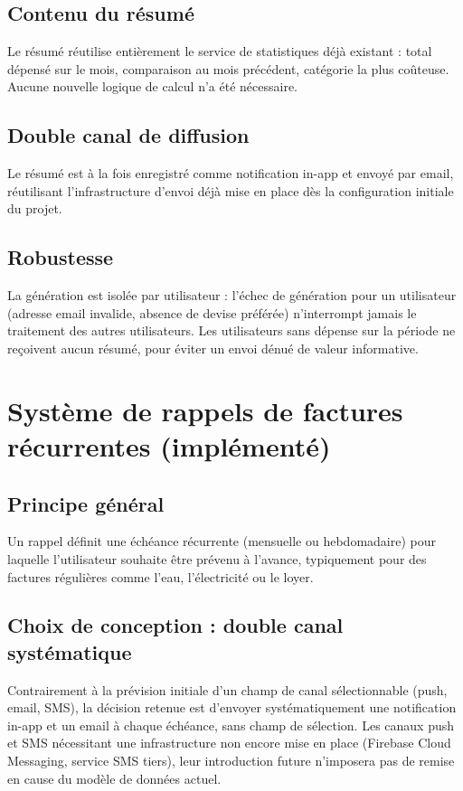 \documentclass[11pt,a4paper]{article}
\begin{document}
\subsection{Contenu du résumé}
Le résumé réutilise entièrement le service de statistiques déjà existant : total dépensé sur le mois, comparaison au mois précédent, catégorie la plus coûteuse. Aucune nouvelle logique de calcul n'a été nécessaire.

\subsection{Double canal de diffusion}
Le résumé est à la fois enregistré comme notification in-app et envoyé par email, réutilisant l'infrastructure d'envoi déjà mise en place dès la configuration initiale du projet.

\subsection{Robustesse}
La génération est isolée par utilisateur : l'échec de génération pour un utilisateur (adresse email invalide, absence de devise préférée) n'interrompt jamais le traitement des autres utilisateurs. Les utilisateurs sans dépense sur la période ne reçoivent aucun résumé, pour éviter un envoi dénué de valeur informative.

\section{Système de rappels de factures récurrentes (implémenté)}

\subsection{Principe général}
Un rappel définit une échéance récurrente (mensuelle ou hebdomadaire) pour laquelle l'utilisateur souhaite être prévenu à l'avance, typiquement pour des factures régulières comme l'eau, l'électricité ou le loyer.

\subsection{Choix de conception : double canal systématique}
Contrairement à la prévision initiale d'un champ de canal sélectionnable (push, email, SMS), la décision retenue est d'envoyer systématiquement une notification in-app et un email à chaque échéance, sans champ de sélection. Les canaux push et SMS nécessitant une infrastructure non encore mise en place (Firebase Cloud Messaging, service SMS tiers), leur introduction future n'imposera pas de remise en cause du modèle de données actuel.
\end{document}
